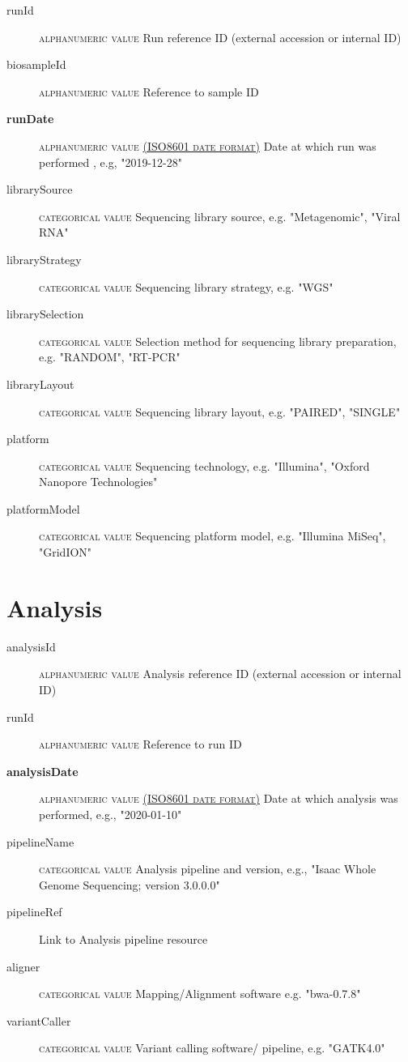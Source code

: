 \documentclass[a4paper, 10pt]{article}        %
\begin{document}
  \begin{description}
	\item[runId] {\textsc{alphanumeric value}} Run reference ID (external accession or internal ID)
	\item[biosampleId] {\textsc{alphanumeric value}}  Reference to sample ID
	\item[\textbf{runDate}] {\textsc{alphanumeric value \href{https://www.iso.org/iso-8601-date-and-time-format.html}{(ISO8601 date format)}}} Date at which run was performed	, e.g, "2019-12-28"
	\item[librarySource] {\textsc{categorical value}}  Sequencing library source, e.g. "Metagenomic", "Viral RNA"
	\item[libraryStrategy]  {\textsc{categorical value}} Sequencing library strategy, e.g. "WGS"
	\item[librarySelection] {\textsc{categorical value}} Selection method for sequencing library preparation, e.g. "RANDOM", "RT-PCR"
	\item[libraryLayout] {\textsc{categorical value}}  Sequencing library layout, e.g. "PAIRED", "SINGLE"
	\item[platform] {\textsc{categorical value}} Sequencing technology, e.g. "Illumina", "Oxford Nanopore Technologies"
	\item[platformModel] {\textsc{categorical value}} Sequencing platform model, e.g. "Illumina MiSeq", "GridION"
 \end{description}
 
 
 
   \section*{ {\color{teal} Analysis}}
  
  \begin{description}
	\item[analysisId] {\textsc{alphanumeric value}} Analysis reference ID (external accession or internal ID)
	\item[runId] {\textsc{alphanumeric value}} Reference to run ID
	\item[\textbf{analysisDate}] {\textsc{alphanumeric value \href{https://www.iso.org/iso-8601-date-and-time-format.html}{(ISO8601 date format)}}} Date at which analysis was performed, e.g., "2020-01-10"
	\item[pipelineName]  {\textsc{categorical value}} Analysis pipeline and version, e.g., "Isaac Whole Genome Sequencing; version 3.0.0.0"
	\item[pipelineRef]  Link to Analysis pipeline resource
	\item[aligner]  {\textsc{categorical value}} Mapping/Alignment software e.g. "bwa-0.7.8"
	  \item[variantCaller]  {\textsc{categorical value}} Variant calling software/ pipeline, e.g. "GATK4.0" %
 \end{description}
 
\end{document}
